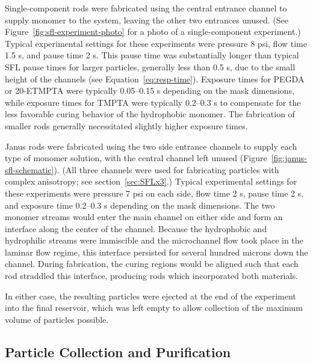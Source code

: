 Single-component rods were fabricated using the central entrance channel to supply monomer to the system, 
leaving the other two entrances unused. (See Figure~\ref{fig:sfl-experiment-photo} for a 
photo of a single-component experiment.)  Typical experimental settings for these experiments were pressure
8 psi, flow time 1.5 s, and pause time 2 s.  This pause time was substantially longer than
typical SFL pause times for larger particles, generally less than 0.5 s, due to the small
height of the channels (see Equation~\ref{eq:resp-time}).  Exposure times for PEGDA or 20-ETMPTA were typically 
0.05--0.15 s
depending on the mask dimensions, while exposure times for TMPTA were typically 0.2--0.3 s to compensate for
the less favorable curing behavior of the hydrophobic monomer.  The fabrication of smaller rods generally
necessitated slightly higher exposure times.  


Janus rods were fabricated using the two side entrance channels to supply each type of monomer solution,
with the central channel left unused (Figure~\ref{fig:janus-sfl-schematic}).  
(All three channels were used for fabricating
particles with complex anisotropy; see
section~\ref{sec:SFLx3}.)  Typical experimental settings for these experiments were pressure 7 psi on each side, 
flow time 2 s, pause time 2 s, and exposure time 0.2--0.3 s depending on the mask dimensions.
The two monomer streams would enter the main channel on either side and form
an interface along the center of the channel. Because the hydrophobic and
hydrophilic streams were immiscible and the microchannel flow took place in the laminar flow regime, 
this interface persisted for several hundred microns down the channel.
During fabrication, the curing regions would be aligned such that each rod straddled this interface,
producing rods which incorporated both materials.

In either case, the resulting particles were ejected at the end of the experiment into the final reservoir, which
was left empty to allow collection of the maximum volume of particles possible.

\subsection{Particle Collection and Purification}
\label{sec:exp-collection}

